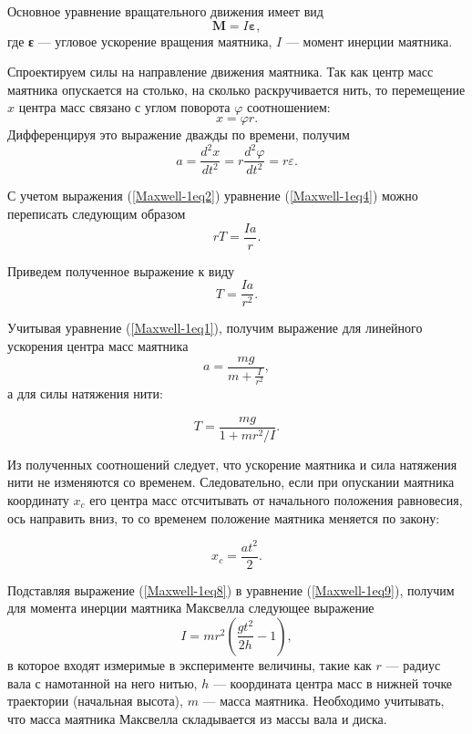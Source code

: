 \documentclass[All.tex]{subfiles}
\begin{document}
	Основное уравнение вращательного движения имеет вид
	\begin{equation}\label{Maxwell-1eq2}
	\textbf{M} = I\textbf{ε},
	\end{equation}
	где \textbf{ε} — угловое ускорение вращения маятника, $ I $ — момент инерции маятника.
	
	Спроектируем силы на направление движения маятника.  
	Так как центр масс маятника опускается на столько, на сколько раскручивается нить, то перемещение $ x $ центра масс связано с углом поворота $ \varphi $ соотношением:
	\begin{equation}\label{Maxwell-1eq3}
	x = \varphi r.
	\end{equation}
	Дифференцируя это выражение дважды по времени, получим
	\begin{equation}\label{Maxwell-1eq4}
	a = \frac{d^{2} x}{d t^{2}} = r\frac{d^{2} \varphi}{d t^{2}} = r \varepsilon.
	\end{equation}
	
	С учетом выражения (\ref{Maxwell-1eq2}) уравнение (\ref{Maxwell-1eq4}) можно переписать следующим образом 
	\begin{equation}\label{Maxwell-1eq5}
	rT = \frac{Ia}{r}.
	\end{equation}
	
	Приведем полученное выражение к виду
	\begin{equation}\label{Maxwell-1eq6}
	T = \frac{Ia}{r^{2}}.
	\end{equation}
	
	Учитывая уравнение (\ref{Maxwell-1eq1}), получим выражение для линейного ускорения центра масс маятника
	\begin{equation}\label{Maxwell-1eq7}
	a = \frac{mg}{m + \frac{I}{r^{2}}},
	\end{equation}
	а для силы натяжения нити:
	
	\begin{equation}\label{Maxwell-1eq8}
	T = \frac{mg}{1 + mr^2/I}.
	\end{equation}
	
	Из полученных соотношений следует, что ускорение маятника и сила натяжения нити не изменяются со временем. 
	Следовательно, если при опускании маятника координату $ x_c $ его центра масс отсчитывать от начального положения равновесия, ось направить вниз, то со временем положение маятника меняется по закону:
	
	\begin{equation}\label{Maxwell-1eq9}
	x_c = \frac{at^{2}}{2}.
	\end{equation}
	
	Подставляя выражение (\ref{Maxwell-1eq8}) в уравнение (\ref{Maxwell-1eq9}), получим для момента инерции маятника Максвелла следующее выражение
	\begin{equation}\label{Maxwell-1eq10}
	I = mr^{2}\left(\frac{gt^{2}}{2h} - 1 \right),
	\end{equation}
	в которое входят измеримые в эксперименте величины, такие как $ r $ — радиус вала с намотанной на него нитью, $ h $ — координата центра масс в нижней точке траектории (начальная высота), $ m $ — масса маятника.
	Необходимо учитывать, что масса маятника Максвелла складывается из массы вала и диска.
	
	
\end{document}
